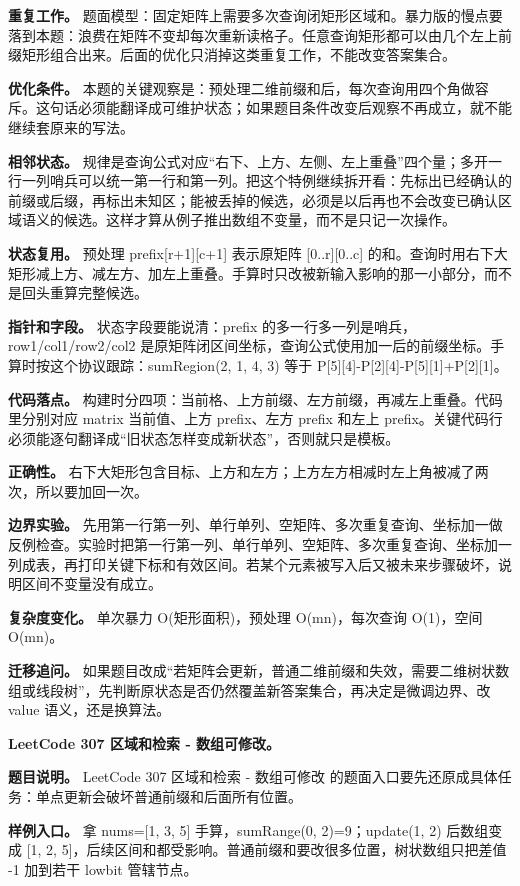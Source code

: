 \textbf{重复工作。} 题面模型：固定矩阵上需要多次查询闭矩形区域和。暴力版的慢点要落到本题：浪费在矩阵不变却每次重新读格子。任意查询矩形都可以由几个左上前缀矩形组合出来。后面的优化只消掉这类重复工作，不能改变答案集合。

\textbf{优化条件。} 本题的关键观察是：预处理二维前缀和后，每次查询用四个角做容斥。这句话必须能翻译成可维护状态；如果题目条件改变后观察不再成立，就不能继续套原来的写法。

\textbf{相邻状态。} 规律是查询公式对应“右下、上方、左侧、左上重叠”四个量；多开一行一列哨兵可以统一第一行和第一列。把这个特例继续拆开看：先标出已经确认的前缀或后缀，再标出未知区；能被丢掉的候选，必须是以后再也不会改变已确认区域语义的候选。这样才算从例子推出数组不变量，而不是只记一次操作。

\textbf{状态复用。} 预处理 prefix[r+1][c+1] 表示原矩阵 [0..r][0..c] 的和。查询时用右下大矩形减上方、减左方、加左上重叠。手算时只改被新输入影响的那一小部分，而不是回头重算完整候选。

\textbf{指针和字段。} 状态字段要能说清：prefix 的多一行多一列是哨兵，row1/col1/row2/col2 是原矩阵闭区间坐标，查询公式使用加一后的前缀坐标。手算时按这个协议跟踪：sumRegion(2, 1, 4, 3) 等于 P[5][4]-P[2][4]-P[5][1]+P[2][1]。

\textbf{代码落点。} 构建时分四项：当前格、上方前缀、左方前缀，再减左上重叠。代码里分别对应 matrix 当前值、上方 prefix、左方 prefix 和左上 prefix。关键代码行必须能逐句翻译成“旧状态怎样变成新状态”，否则就只是模板。

\textbf{正确性。} 右下大矩形包含目标、上方和左方；上方左方相减时左上角被减了两次，所以要加回一次。

\textbf{边界实验。} 先用第一行第一列、单行单列、空矩阵、多次重复查询、坐标加一做反例检查。实验时把第一行第一列、单行单列、空矩阵、多次重复查询、坐标加一列成表，再打印关键下标和有效区间。若某个元素被写入后又被未来步骤破坏，说明区间不变量没有成立。

\textbf{复杂度变化。} 单次暴力 O(矩形面积)，预处理 O(mn)，每次查询 O(1)，空间 O(mn)。

\textbf{迁移追问。} 如果题目改成“若矩阵会更新，普通二维前缀和失效，需要二维树状数组或线段树”，先判断原状态是否仍然覆盖新答案集合，再决定是微调边界、改 value 语义，还是换算法。

\noindent\textbf{LeetCode 307 区域和检索 - 数组可修改。}

\textbf{题目说明。} LeetCode 307 区域和检索 - 数组可修改 的题面入口要先还原成具体任务：单点更新会破坏普通前缀和后面所有位置。

\textbf{样例入口。} 拿 nums=[1, 3, 5] 手算，sumRange(0, 2)=9；update(1, 2) 后数组变成 [1, 2, 5]，后续区间和都受影响。普通前缀和要改很多位置，树状数组只把差值 -1 加到若干 lowbit 管辖节点。

